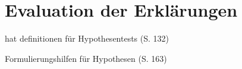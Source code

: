 \section{Evaluation der Erklärungen}

\cite{wohlin2012experimentation} hat definitionen für Hypothesentests (S. 132)

\cite{wohlin2012experimentation} Formulierungshilfen für Hypothesen (S. 163)






